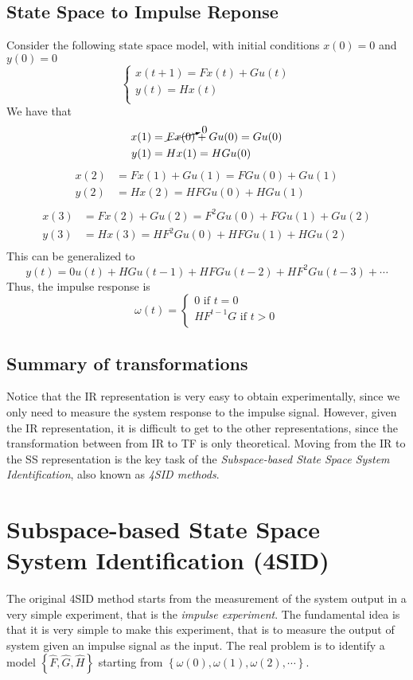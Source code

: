 \subsection{State Space to Impulse Reponse}
Consider the following state space model, with initial conditions $x(0) = 0$ and $y(0) = 0$
\[
    \begin{cases}
        x(t+1) = F x(t) + G u(t)\\
        y(t) = H x(t)\\
    \end{cases}
\]
We have that
\begin{align*}
    x(1) &= \cancelto{0}{F x(0)} + G u(0) = G u(0)\\
    y(1) &= H x(1) = H G u(0)\\
\end{align*}
\begin{align*}
    x(2) &= F x(1) + G u(1) = F G u(0) + G u(1)\\
    y(2) &= H x(2) = H F G u(0) + H G u(1)\\
\end{align*}
\begin{align*}
    x(3) &= F x(2) + G u(2) = F^2 G u(0) + F G u(1) + G u(2)\\
    y(3) &= H x(3) = H F^2 G u(0) + H F G u(1) + H G u(2)\\
\end{align*}
This can be generalized to
\[ y(t) = 0 u(t) + H G u(t-1) + H F G u(t-2) + H F^2 G u(t-3) + \cdots \]
Thus, the impulse response is
\[
    \omega(t) =
    \begin{cases}
        0 \text{ if } t = 0\\
        H F^{t-1} G \text{ if } t > 0\\
    \end{cases}
\]

\subsection{Summary of transformations}
Notice that the IR representation is very easy to obtain experimentally, since we only need to measure the system response to the impulse signal.
However, given the IR representation, it is difficult to get to the other representations, since the transformation between from IR to TF is only theoretical.
Moving from the IR to the SS representation is the key task of the \emph{Subspace-based State Space System Identification}, also known as \emph{4SID methods}.

\section{Subspace-based State Space System Identification (4SID)}
The original 4SID method starts from the measurement of the system output in a very simple experiment, that is the \emph{impulse experiment}.
The fundamental idea is that it is very simple to make this experiment, that is to measure the output of system given an impulse signal as the input.
The real problem is to identify a model $\left\{ \hat{F}, \hat{G}, \hat{H} \right\}$ starting from $\left\{ \omega(0), \omega(1), \omega(2), \cdots \right\}$.

